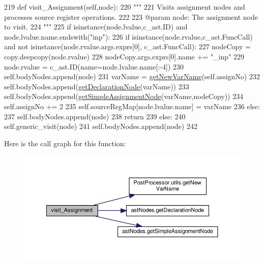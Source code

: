 \begin{DoxyCode}
219     \textcolor{keyword}{def }visit\_Assignment(self,node):
220         \textcolor{stringliteral}{"""
}
221 \textcolor{stringliteral}{        Visits assignment nodes and processes source register operations.
}
222 \textcolor{stringliteral}{
}
223 \textcolor{stringliteral}{        @param node: The assignment node to visit.
}
224 \textcolor{stringliteral}{        """}
225         \textcolor{keywordflow}{if} isinstance(node.lvalue,c\_ast.ID) \textcolor{keywordflow}{and} node.lvalue.name.endswith(\textcolor{stringliteral}{"inp"}):
226             \textcolor{keywordflow}{if} isinstance(node.rvalue,c\_ast.FuncCall) \textcolor{keywordflow}{and} \textcolor{keywordflow}{not} isinstance(node.rvalue.args.exprs[0],
      c\_ast.FuncCall):
227                 nodeCopy = copy.deepcopy(node.rvalue)
228                 nodeCopy.args.exprs[0].name += \textcolor{stringliteral}{"\_inp"}
229                 node.rvalue = c\_ast.ID(name=node.lvalue.name[:-4])
230                 self.bodyNodes.append(node)
231                 varName = \hyperlink{namespacePostProcessor_1_1utils_a69c4094b747eccefbd43b8011b1c3626}{getNewVarName}(self.assignNo)
232                 self.bodyNodes.append(\hyperlink{namespaceastNodes_ae5e5c7f09a1586002b20db6d72f6d30b}{getDeclarationNode}(varName))
233                 self.bodyNodes.append(\hyperlink{namespaceastNodes_a2403f5d006e54f20e614226280cb6cbc}{getSimpleAssignmentNode}(varName,nodeCopy))
234                 self.assignNo += 2
235                 self.sourceRegMap[node.lvalue.name] = varName
236             \textcolor{keywordflow}{else}:
237                 self.bodyNodes.append(node)
238             \textcolor{keywordflow}{return}
239         \textcolor{keywordflow}{else}:
240             self.generic\_visit(node)
241             self.bodyNodes.append(node)
242 \end{DoxyCode}
Here is the call graph for this function\+:\nopagebreak
\begin{figure}[H]
\begin{center}
\leavevmode
\includegraphics[width=350pt]{classPostProcessor_1_1Visitor_1_1SourceRegHandler_adae6ad6f5b94c4acd95924bb3df9ebc8_cgraph}
\end{center}
\end{figure}
